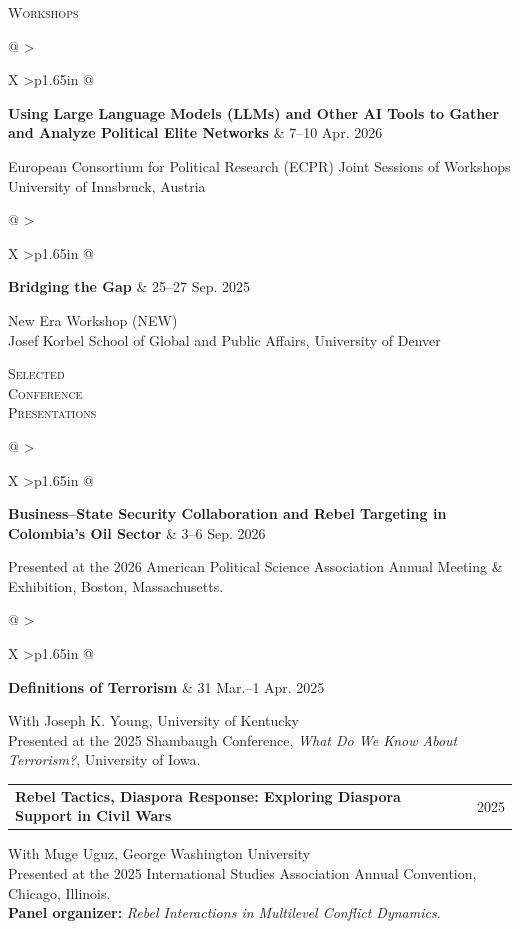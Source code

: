 \documentclass[10pt,letterpaper]{article}
\makeatletter
\newlength{\labelcol}
\newlength{\colgap}
\newcommand{\cvrow}[2]{%
  \noindent
  \begin{minipage}[t]{\labelcol}
    \vspace{0pt}
    \raggedright\textsc{#1}
  \end{minipage}%
  \hspace{\colgap}%
  \begin{minipage}[t]{%
    \dimexpr\textwidth-\labelcol-\colgap\relax
  }
    \vspace{0pt}
    \raggedright #2
  \end{minipage}\par
}
\newcommand{\datedline}[2]{%
  \noindent
  \begin{tabularx}{\linewidth}{%
    @{}
    >{\raggedright\arraybackslash}X
    >{\raggedleft\arraybackslash\small}p{1.65in}
    @{}
  }
    #1 & #2
  \end{tabularx}\par
}
\newcommand{\entrygap}{\vspace{0.75em}}
\newcommand{\sectiongap}{\vspace{1.30em}}
\makeatother
\begin{document}
\cvrow{Workshops}{%
  \datedline{%
    \textbf{Using Large Language Models (LLMs) and Other AI Tools
    to Gather and Analyze Political Elite Networks}
  }{7--10 Apr. 2026}

  European Consortium for Political Research (ECPR)
  Joint Sessions of Workshops\\
  University of Innsbruck, Austria
}

\entrygap

\cvrow{}{%
  \datedline{%
    \textbf{Bridging the Gap}
  }{25--27 Sep. 2025}

  New Era Workshop (NEW)\\
  Josef Korbel School of Global and Public Affairs,
  University of Denver
}

\sectiongap


\cvrow{Selected\\Conference\\Presentations}{%
  \datedline{%
    \textbf{Business--State Security Collaboration and Rebel
    Targeting in Colombia's Oil Sector}
  }{3--6 Sep. 2026}

  Presented at the 2026 American Political Science Association
  Annual Meeting \& Exhibition, Boston, Massachusetts.
}

\entrygap

\cvrow{}{%
  \datedline{%
    \textbf{Definitions of Terrorism}
  }{31 Mar.--1 Apr. 2025}

  With Joseph K. Young, University of Kentucky\\
  Presented at the 2025 Shambaugh Conference,
  \textit{What Do We Know About Terrorism?},
  University of Iowa.
}

\entrygap

\cvrow{}{%
  \datedline{%
    \textbf{Rebel Tactics, Diaspora Response:
    Exploring Diaspora Support in Civil Wars}
  }{2025}

  With Muge Uguz, George Washington University\\
  Presented at the 2025 International Studies Association
  Annual Convention, Chicago, Illinois.\\
  \textbf{Panel organizer:}
  \textit{Rebel Interactions in Multilevel Conflict Dynamics}.
}

\entrygap
\end{document}
